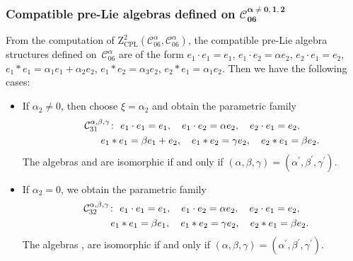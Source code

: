 \documentclass[pdftex]{sigma}
\numberwithin{equation}{section}
\begin{document}
\subsubsection[Compatible pre-Lie algebras defined on C\_\{06\}\^{}\{alpha not= 0,1,2\}]{Compatible pre-Lie algebras defined on $\boldsymbol{\mathcal{C}_{06}^{\alpha \neq 0,1,2}}$}

From the computation of $\mathrm{Z}_{\mathrm{CPL}}^{2}(\mathcal{C}%
_{06}^{\alpha },\mathcal{C}_{06}^{\alpha })$, the compatible pre-Lie algebra
structures defined on~$\mathcal{C}_{06}^{\alpha }$ are of the form
$e_{1}\cdot e_{1}=e_{1}$, $e_{1}\cdot e_{2}=\alpha e_{2}$, $e_{2}\cdot
e_{1}=e_{2}$, $e_{1}\ast e_{1}=\alpha _{1}e_{1}+\alpha _{2}e_{2}$, $e_{1}\ast
e_{2}=\alpha _{3}e_{2}$, $e_{2}\ast e_{1}=\alpha _{1}e_{2}$.
Then we have the following cases:
\begin{itemize}\itemsep=0pt
\item If $\alpha _{2}\neq 0$, then choose $\xi =\alpha _{2}$ and obtain the
parametric family
\begin{gather*}
\mathcal{C}_{31}^{\alpha ,\beta ,\gamma } \colon \
e_{1}\cdot e_{1}=e_{1}, \quad e_{1}\cdot e_{2}=\alpha e_{2}, \quad e_{2}\cdot
e_{1}=e_{2}, \\
\hphantom{\mathcal{C}_{31}^{\alpha ,\beta ,\gamma } \colon} \
e_{1}\ast e_{1}=\beta e_{1}+e_{2},\quad e_{1}\ast e_{2}=\gamma e_{2},\quad
e_{2}\ast e_{1}=\beta e_{2}.
\end{gather*}
The algebras  and  are isomorphic
if and only if $(\alpha, \beta, \gamma)=(\alpha ^{\prime },\beta ^{\prime },
\gamma ^{\prime })$.

\item If $\alpha _{2}=0$, we obtain the parametric family
\begin{gather*}
\mathcal{C}_{32}^{\alpha ,\beta ,\gamma } \colon \
e_{1}\cdot e_{1}=e_{1},\quad e_{1}\cdot e_{2}=\alpha e_{2},\quad e_{2}\cdot
e_{1}=e_{2}, \\
\hphantom{\mathcal{C}_{32}^{\alpha ,\beta ,\gamma } \colon} \
e_{1}\ast e_{1}=\beta e_{1},\quad e_{1}\ast e_{2}=\gamma e_{2},\quad
e_{2}\ast e_{1}=\beta e_{2}.
\end{gather*}
The algebras , \smash{$\mathcal{C}%
_{32}^{\alpha ^{\prime },\beta ^{\prime },\gamma ^{\prime }}$} are isomorphic
if and only if $(\alpha, \beta, \gamma)=(\alpha ^{\prime },\beta ^{\prime },
\gamma ^{\prime })$.
\end{itemize}
\end{document}
